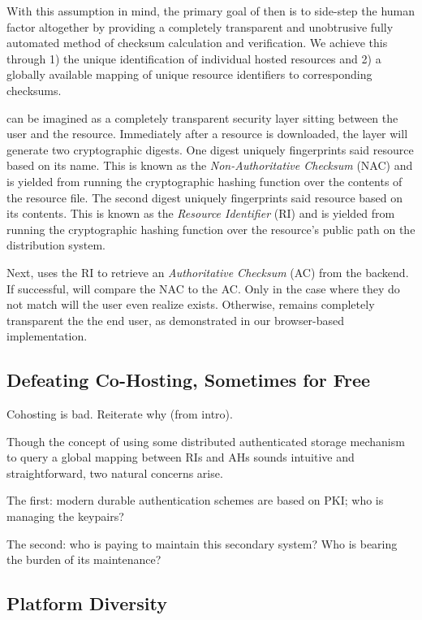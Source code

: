 With this assumption in mind, the primary goal of \SYSTEM{} then is to side-step
the human factor altogether by providing a completely transparent and
unobtrusive fully automated method of checksum calculation and verification. We
achieve this through 1) the unique identification of individual hosted resources
and 2) a globally available mapping of unique resource identifiers to
corresponding checksums.

\SYSTEM{} can be imagined as a completely transparent security layer sitting
between the user and the resource. Immediately after a resource is downloaded,
the \SYSTEM{} layer will generate two cryptographic digests. One digest uniquely
fingerprints said resource based on its name. This is known as the
\emph{Non-Authoritative Checksum} (NAC) and is yielded from running the
cryptographic hashing function over the contents of the resource file. The
second digest uniquely fingerprints said resource based on its contents. This is
known as the \emph{Resource Identifier} (RI) and is yielded from running the
cryptographic hashing function over the resource's public path on the
distribution system.

Next, \SYSTEM{} uses the RI to retrieve an \emph{Authoritative Checksum} (AC)
from the backend. If successful, \SYSTEM{} will compare the NAC to the AC. Only
in the case where they do not match will the user even realize \SYSTEM{} exists. Otherwise, \SYSTEM{} remains completely transparent the the end user, as demonstrated in our browser-based implementation.


\subsection{Defeating Co-Hosting, Sometimes for Free}

Cohosting is bad. Reiterate why (from intro).

Though the concept of using some distributed authenticated storage mechanism to
query a global mapping between RIs and AHs sounds intuitive and straightforward,
two natural concerns arise.

The first: modern durable authentication schemes are based on PKI; who is
managing the keypairs?

The second: who is paying to maintain this secondary system? Who is bearing the
burden of its maintenance?

\subsection{Platform Diversity}

